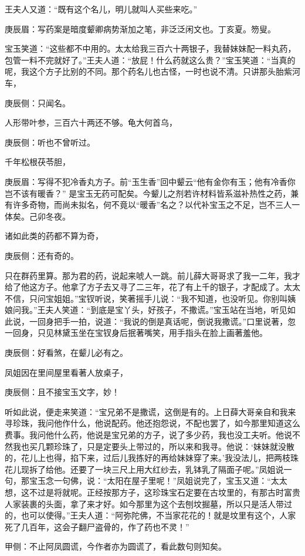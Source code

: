 \begin{parag}
    王夫人又道：“既有这个名儿，明儿就叫人买些来吃。”\begin{note}庚辰眉：写药案是暗度颦卿病势渐加之笔，非泛泛闲文也。丁亥夏。笏叟。\end{note}宝玉笑道：“这些都不中用的。太太给我三百六十两银子，我替妹妹配一料丸药，包管一料不完就好了。”王夫人道：“放屁！什么药就这么贵？”宝玉笑道：“当真的呢，我这个方子比别的不同。那个药名儿也古怪，一时也说不清。只讲那头胎紫河车，\begin{note}庚辰侧：只闻名。\end{note}人形带叶参，三百六十两还不够。龟大何首乌，\begin{note}庚辰侧：听也不曾听过。\end{note}千年松根茯苓胆，\begin{note}庚辰眉：写得不犯冷香丸方子。前“玉生香”回中颦云“他有金你有玉；他有冷香你岂不该有暖香？” 是宝玉无药可配矣。今颦儿之剂若许材料皆系滋补热性之药，兼有许多奇物，而尚未拟名，何不竟以“暖香”名之？以代补宝玉之不足，岂不三人一体矣。己卯冬夜。\end{note}诸如此类的药都不算为奇，\begin{note}庚辰侧：还有奇的。\end{note}只在群药里算。那为君的药，说起来唬人一跳。前儿薛大哥哥求了我一二年，我才给了他这方子。他拿了方子去又寻了二三年，花了有上千的银子，才配成了。太太不信，只问宝姐姐。”宝钗听说，笑著摇手儿说：“我不知道，也没听见。你别叫姨娘问我。”王夫人笑道：“到底是宝丫头，好孩子，不撒谎。”宝玉站在当地，听见如此说，一回身把手一拍，说道：“我说的倒是真话呢，倒说我撒谎。”口里说著，忽一回身，只见林黛玉坐在宝钗身后抿著嘴笑，用手指头在脸上画著羞他。\begin{note}庚辰侧：好看煞，在颦儿必有之。\end{note}
\end{parag}


\begin{parag}
    凤姐因在里间屋里看著人放桌子，\begin{note}庚辰侧：且不接宝玉文字，妙！\end{note}听如此说，便走来笑道：“宝兄弟不是撒谎，这倒是有的。上日薛大哥亲自和我来寻珍珠，我问他作什么，他说配药。他还抱怨说，不配也罢了，如今那里知道这么费事。我问他什么药，他说是宝兄弟的方子，说了多少药，我也没工夫听。他说不然我也买几颗珍珠了，只是定要头上带过的，所以来和我寻。他说：‘妹妹就没散的，花儿上也得，掐下来，过后儿我拣好的再给妹妹穿了来。’我没法儿，把两枝珠花儿现拆了给他。还要了一块三尺上用大红纱去，乳钵乳了隔面子呢。”凤姐说一句，那宝玉念一句佛，说：“太阳在屋子里呢！”凤姐说完了，宝玉又道：“太太想，这不过是将就呢。正经按那方子，这珍珠宝石定要在古坟里的，有那古时富贵人家装裹的头面，拿了来才好。如今那里为这个去刨坟掘墓，所以只是活人带过的，也可以使得。”王夫人道：“阿弥陀佛，不当家花花的！就是坟里有这个，人家死了几百年，这会子翻尸盗骨的，作了药也不灵！”\begin{note}甲侧：不止阿凤圆谎，今作者亦为圆谎了，看此数句则知矣。\end{note}
\end{parag}


